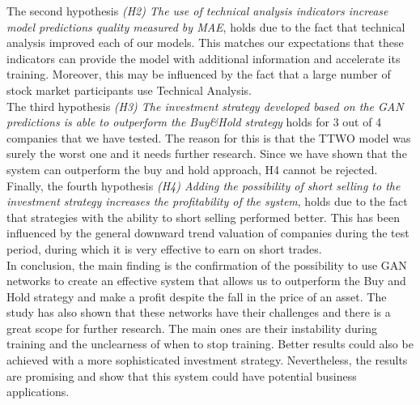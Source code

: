 \documentclass[review]{elsarticle} %
\begin{document}
The second hypothesis\textit{ (H2) The use of technical analysis indicators increase model predictions quality measured by MAE}, holds due to the fact that technical analysis improved each of our models. This matches our expectations that these indicators can provide the model with additional information and accelerate its training. Moreover, this may be influenced by the fact that a large number of stock market participants use Technical Analysis.\\

The third hypothesis\textit{ (H3) The investment strategy developed based on the GAN predictions is able to outperform the Buy\&Hold strategy} holds for 3 out of 4 companies that we have tested. The reason for this is that the TTWO model was surely the worst one and it needs further research. Since we have shown that the system can outperform the buy and hold approach, H4 cannot be rejected.\\

Finally, the fourth hypothesis\textit{ (H4) Adding the possibility of short selling to the investment strategy increases the profitability of the system}, holds due to the fact that strategies with the ability to short selling performed better.  This has been influenced by the general downward trend valuation of companies during the test period, during which it is very effective to earn on short trades.\\

In conclusion, the main finding is the confirmation of the possibility to use GAN networks to create an effective system that allows us to outperform the Buy and Hold strategy and make a profit despite the fall in the price of an asset. The study has also shown that these networks have their challenges and there is a great scope for further research. The main ones are their instability during training and the unclearness of when to stop training.  Better results could also be achieved with a more sophisticated investment strategy. Nevertheless, the results are promising and show that this system could have potential business applications.

\pagebreak
\nocite{*}



\listoffigures
\listoftables
\end{document}
